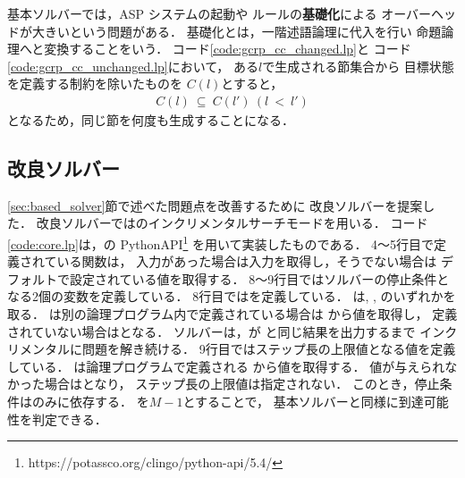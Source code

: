 基本ソルバーでは，ASP システムの起動や
ルールの\textbf{基礎化}による
オーバーヘッドが大きいという問題がある．
基礎化とは，一階述語論理に代入を行い
命題論理へと変換することをいう．
コード\ref{code:gcrp_cc_changed.lp}と
コード\ref{code:gcrp_cc_unchanged.lp}において，
ある$l$で生成される節集合から
目標状態を定義する制約を除いたものを
$C(l)$とすると，
\begin{align}
  C(l) \: \subseteq \: C(l') \: (l \: < \: l')
\end{align}
となるため，同じ節を何度も生成することになる．

\subsection{改良ソルバー}



\ref{sec:based_solver}節で述べた問題点を改善するために
改良ソルバーを提案した．
改良ソルバーでは{\clingo}のインクリメンタルサーチモードを用いる．
コード\ref{code:core.lp}は，{\clingo}の 
PythonAPI\footnote{https://potassco.org/clingo/python-api/5.4/} 
を用いて実装したものである．
4～5行目で定義されている関数は，
入力があった場合は入力を取得し，そうでない場合は
デフォルトで設定されている値を取得する．
8～9行目ではソルバーの停止条件となる2個の変数を定義している．
8行目ではを定義している．
は, , 
のいずれかを取る．
は別の論理プログラム内で定義されている場合は
から値を取得し，
定義されていない場合はとなる．
ソルバーは，{\clingo}が
と同じ結果を出力するまで
インクリメンタルに問題を解き続ける．
9行目ではステップ長の上限値となる値を定義している．
は論理プログラムで定義される
から値を取得する．
値が与えられなかった場合はとなり，
ステップ長の上限値は指定されない．
このとき，停止条件はのみに依存する．
を$M-1$とすることで，
基本ソルバーと同様に到達可能性を判定できる．


